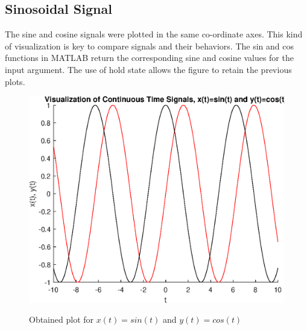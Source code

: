 \documentclass{lab_sheet}
\begin{document}
    \subsection{Sinosoidal Signal}
    The sine and cosine signals were plotted in the same co-ordinate axes. This kind of visualization is key to compare signals and their behaviors. The sin and cos functions in MATLAB return the corresponding sine and cosine values for the input argument. The use of hold state allows the figure to retain the previous plots.
    \begin{figure}[H]
        \centering
        \includegraphics[scale=0.6]{./Figures/sinosoidal}
        \label{fig:sinosoidal}
        \caption{Obtained plot for $x(t)=sin(t)$ and $y(t)=cos(t)$}
    \end{figure}
\end{document}
